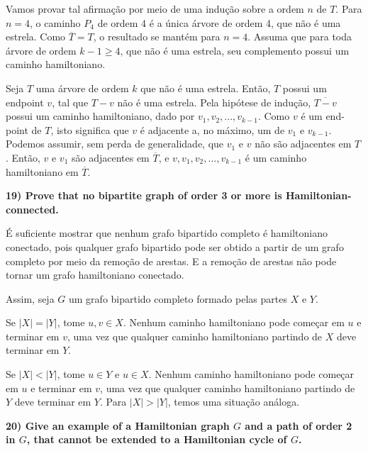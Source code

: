 \documentclass[]{article}
\begin{document}
Vamos provar tal afirmação por meio de uma indução sobre a ordem $n$ de $T$. Para $n=4$, o caminho $P_4$ de ordem 4 é a única árvore de ordem 4, que não é uma estrela. Como $\overline{T} = T$, o resultado se mantém para $n=4$. Assuma que para toda árvore de ordem $k-1 \geq 4$, que não é uma estrela, seu complemento possui um caminho hamiltoniano.

Seja $T$ uma árvore de ordem $k$ que não é uma estrela. Então, $T$ possui um endpoint $v$, tal que $T-v$ não é uma estrela. Pela hipótese de indução, $\overline{T-v}$ possui um caminho hamiltoniano, dado por $v_1, v_2, ..., v_{k-1}$. Como $v$ é um end-point de $T$, isto significa que $v$ é adjacente a, no máximo, um de $v_1$ e $v_{k-1}$. Podemos assumir, sem perda de generalidade, que $v_1$ e $v$ não são adjacentes em $T$. Então, $v$ e $v_1$ são adjacentes em $\overline{T}$, e $v, v_1, v_2, ..., v_{k-1}$ é um caminho hamiltoniano em $\overline{T}$.

\newpage

\noindent \textbf{19) Prove that no bipartite graph of order 3 or more is Hamiltonian-connected.}

É suficiente mostrar que nenhum grafo bipartido completo é hamiltoniano conectado, pois qualquer grafo bipartido pode ser obtido a partir de um grafo completo por meio da remoção de arestas. E a remoção de arestas não pode tornar um grafo hamiltoniano conectado.

Assim, seja $G$ um grafo bipartido completo formado pelas partes $X$ e $Y$. 

Se $|X| = |Y|$, tome $u, v \in X$. Nenhum caminho hamiltoniano pode começar em $u$ e terminar em $v$, uma vez que qualquer caminho hamiltoniano partindo de $X$ deve terminar em $Y$.

Se $|X| < |Y|$, tome $u \in Y$ e $u \in X$. Nenhum caminho hamiltoniano pode começar em $u$ e terminar em $v$, uma vez que qualquer caminho hamiltoniano partindo de $Y$ deve terminar em $Y$. Para $|X| > |Y|$, temos uma situação análoga.

\newpage

\noindent \textbf{20) Give an example of a Hamiltonian graph $G$ and a path of order 2 in $G$, that cannot be extended to a Hamiltonian cycle of $G$.}
\end{document}
